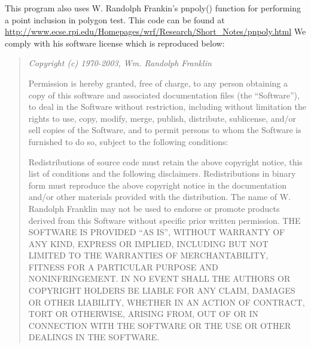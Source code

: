 This program also uses W. Randolph Frankin's pnpoly() 
function for performing a point inclusion in polygon test. 
This code can be found at
\url{http://www.ecse.rpi.edu/Homepages/wrf/Research/Short\_Notes/pnpoly.html}
We comply with his software license which is reproduced below\cite{Franklin05}:
\begin{quotation}\em
Copyright (c) 1970-2003, Wm. Randolph Franklin

Permission is hereby granted, free of charge, to any person obtaining a copy of this software and associated documentation files (the ``Software''), to deal in the Software without restriction, including without limitation the rights to use, copy, modify, merge, publish, distribute, sublicense, and/or sell copies of the Software, and to permit persons to whom the Software is furnished to do so, subject to the following conditions:

Redistributions of source code must retain the above copyright notice, this list of conditions and the following disclaimers.
Redistributions in binary form must reproduce the above copyright notice in the documentation and/or other materials provided with the distribution.
The name of W. Randolph Franklin may not be used to endorse or promote products derived from this Software without specific prior written permission.
THE SOFTWARE IS PROVIDED ``AS IS'', WITHOUT WARRANTY OF ANY KIND, EXPRESS OR IMPLIED, INCLUDING BUT NOT LIMITED TO THE WARRANTIES OF MERCHANTABILITY, FITNESS FOR A PARTICULAR PURPOSE AND NONINFRINGEMENT. IN NO EVENT SHALL THE AUTHORS OR COPYRIGHT HOLDERS BE LIABLE FOR ANY CLAIM, DAMAGES OR OTHER LIABILITY, WHETHER IN AN ACTION OF CONTRACT, TORT OR OTHERWISE, ARISING FROM, OUT OF OR IN CONNECTION WITH THE SOFTWARE OR THE USE OR OTHER DEALINGS IN THE SOFTWARE.
\end{quotation}

